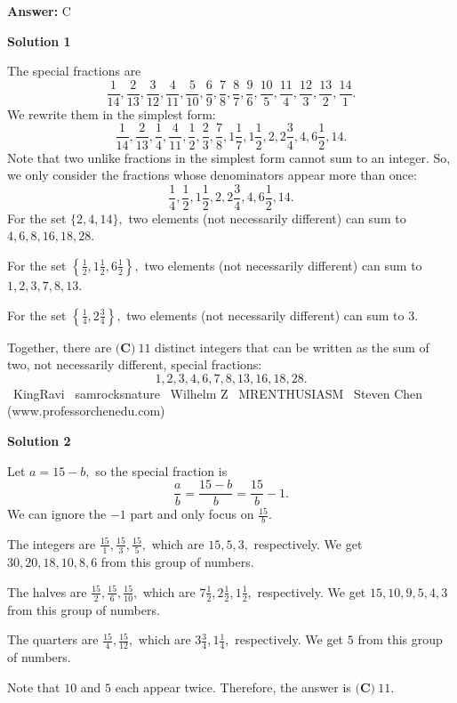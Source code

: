 \begin{enumerate}
 \textbf{Answer: }C



\textbf{Solution 1}

The special fractions are 
 \[\frac{1}{14},\frac{2}{13},\frac{3}{12},\frac{4}{11},\frac{5}{10},\frac{6}{9},\frac{7}{8},\frac{8}{7},\frac{9}{6},\frac{10}{5},\frac{11}{4},\frac{12}{3},\frac{13}{2},\frac{14}{1}.\]We rewrite them in the simplest form: 
 \[\frac{1}{14},\frac{2}{13},\frac{1}{4},\frac{4}{11},\frac{1}{2},\frac{2}{3},\frac{7}{8},1\frac{1}{7},1\frac{1}{2},2,2\frac{3}{4},4,6\frac{1}{2},14.\]Note that two unlike fractions in the simplest form cannot sum to an integer. So, we only consider the fractions whose denominators appear more than once: 
 \[\frac{1}{4},\frac{1}{2},1\frac{1}{2},2,2\frac{3}{4},4,6\frac{1}{2},14.\]For the set $\{2,4,14\},$ two elements (not necessarily different) can sum to $4,6,8,16,18,28.$

 For the set $\left\{\frac{1}{2},1\frac{1}{2},6\frac{1}{2}\right\},$ two elements (not necessarily different) can sum to $1,2,3,7,8,13.$

 For the set $\left\{\frac{1}{4},2\frac{3}{4}\right\},$ two elements (not necessarily different) can sum to $3.$

 Together, there are $\boxed{\textbf{(C)}\  11}$ distinct integers that can be written as the sum of two, not necessarily different, special fractions: 
 \[1,2,3,4,6,7,8,13,16,18,28.\]~KingRavi ~samrocksnature ~Wilhelm Z ~MRENTHUSIASM ~Steven Chen (www.professorchenedu.com)

 



\textbf{Solution 2}

Let $a=15-b,$ so the special fraction is 
 \[\frac ab = \frac{15-b}{b} = \frac{15}{b}-1.\]We can ignore the $-1$ part and only focus on $\frac{15}{b}.$

 The integers are $\frac{15}{1},\frac{15}{3},\frac{15}{5},$ which are $15,5,3,$ respectively. We get $30,20,18,10,8,6$ from this group of numbers.

 The halves are $\frac{15}{2},\frac{15}{6},\frac{15}{10},$ which are $7\frac12,2\frac12,1\frac12,$ respectively. We get $15,10,9,5,4,3$ from this group of numbers.

 The quarters are $\frac{15}{4},\frac{15}{12},$ which are $3\frac34,1\frac14,$ respectively. We get $5$ from this group of numbers.

 Note that $10$ and $5$ each appear twice. Therefore, the answer is $\boxed{\textbf{(C)}\  11}.$





\end{enumerate}
